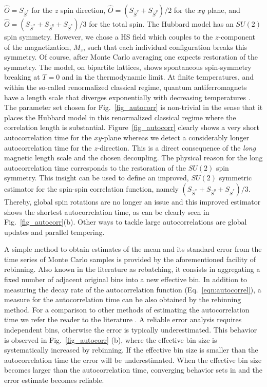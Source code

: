 $\hat{O} = S_{\hat{S}^{z}}$ for the $z$ spin direction, 
$\hat{O} =(S_{\hat{S}^{x}} + S_{\hat{S}^{y}})/2$ for the $xy$ plane, and
$\hat{O} =(S_{\hat{S}^{x}} + S_{\hat{S}^{y}}+ S_{\hat{S}^{z}})/3$ for the total spin.
The Hubbard model has an $SU(2)$ spin symmetry. However, we chose a HS field which couples to the $z$-component of the magnetization,  $M_z$,  such that each individual configuration breaks this symmetry. Of course, after Monte Carlo averaging one expects restoration of the symmetry. The model, on bipartite  lattices,  shows spontaneous spin-symmetry breaking at $T=0$ and in the thermodynamic limit.  At finite temperatures, and within the so-called renormalized classical regime,  quantum antiferromagnets have a length scale  that  diverges  exponentially  with decreasing temperatures \cite{Chakravarty88}.     
The parameter set chosen for Fig.~\ref{fig_autocorr}  is non-trivial in the sense that it places the Hubbard model in this renormalized classical regime where the correlation length is substantial.  Figure~\ref{fig_autocorr}  clearly shows a very short autocorrelation time for the $xy$-plane whereas we detect a considerably longer  autocorrelation time  for the $z$-direction.  This is a direct consequence of the \emph{long} magnetic length scale and the chosen decoupling.
The physical reason for the long autocorrelation time  corresponds to  the restoration of the $SU(2)$ spin symmetry.    This insight can be used to define an improved, $SU(2)$ symmetric estimator for the spin-spin correlation function, namely
$(S_{\hat{S}^{x}} + S_{\hat{S}^{y}} + S_{\hat{S}^{z}})/3$. 
Thereby, global spin rotations are no longer an issue and this improved estimator  shows the shortest autocorrelation time, as can be clearly seen in Fig.~\ref{fig_autocorr}(b). Other ways to tackle large autocorrelations are global updates and parallel tempering.

A simple method to obtain estimates of the mean and its standard error from the time series of Monte Carlo samples is provided by the aforementioned facility of rebinning. Also known in the literature as rebatching, it consists in aggregating a fixed number  of adjacent original bins into a new effective bin.
In addition to measuring the decay rate of the autocorrelation function (Eq.~\eqref{eqn:autocorrel}), a measure for the autocorrelation time  can be also obtained by the rebinning method. 
For a comparison to other methods of estimating the autocorrelation time we refer the reader to the literature \cite{Thompson2010, Geyer1992, neal1993}.
A reliable error analysis requires independent bins, otherwise the error is typically underestimated. This behavior is observed in Fig.~\ref{fig_autocorr} (b), where the effective bin size is systematically increased by rebinning. If the effective bin size is smaller than the autocorrelation time the error will be underestimated. When the effective bin size becomes  larger than the autocorrelation time, converging behavior sets in and the error estimate becomes reliable.


